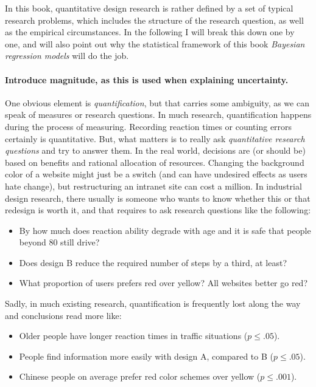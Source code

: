 \documentclass[]{svmono}
\providecommand{\tightlist}{%
  \setlength{\itemsep}{0pt}\setlength{\parskip}{0pt}}
\let\oldparagraph\paragraph
\renewcommand{\paragraph}[1]{\oldparagraph{#1}\mbox{}}
\begin{document}
In this book, quantitative design research is rather defined by a set of
typical research problems, which includes the structure of the research
question, as well as the empirical circumstances. In the following I
will break this down one by one, and will also point out why the
statistical framework of this book \emph{Bayesian regression models}
will do the job.

\paragraph{Introduce magnitude, as this is used when explaining
uncertainty.}\label{introduce-magnitude-as-this-is-used-when-explaining-uncertainty.}

One obvious element is \emph{quantification}, but that carries some
ambiguity, as we can speak of measures or research questions. In much
research, quantification happens during the process of measuring.
Recording reaction times or counting errors certainly is quantitative.
But, what matters is to really ask \emph{quantitative research
questions} and try to answer them. In the real world, decisions are (or
should be) based on benefits and rational allocation of resources.
Changing the background color of a website might just be a switch (and
can have undesired effects as users hate change), but restructuring an
intranet site can cost a million. In industrial design research, there
usually is someone who wants to know whether this or that redesign is
worth it, and that requires to ask research questions like the
following:

\begin{itemize}
\tightlist
\item
  By how much does reaction ability degrade with age and it is safe that
  people beyond 80 still drive?
\item
  Does design B reduce the required number of steps by a third, at
  least?
\item
  What proportion of users prefers red over yellow? All websites better
  go red?
\end{itemize}

Sadly, in much existing research, quantification is frequently lost
along the way and conclusions read more like:

\begin{itemize}
\tightlist
\item
  Older people have longer reaction times in traffic situations
  (\(p \leq .05\)).
\item
  People find information more easily with design A, compared to B
  (\(p \leq .05\)).
\item
  Chinese people on average prefer red color schemes over yellow
  (\(p \leq .001\)).
\end{itemize}
\end{document}

